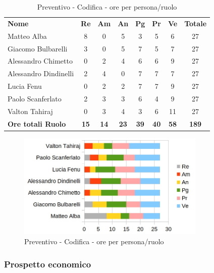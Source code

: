 		\begin{table} [h!]
			\begin{center}
				\begin{tabular} { m{3.5cm} c c c c c c c }
					\rowcolor{lightgray}
					\textbf{Nome} & \textbf{Re} & \textbf{Am} & \textbf{An} & \textbf{Pg} & \textbf{Pr} & \textbf{Ve} & \textbf{Totale} \\
					Matteo Alba & 8 &0 & 5 & 3 & 5 & 6 & 27 \\
					Giacomo Bulbarelli & 3 & 0& 5 & 7 & 5 & 7 & 27 \\
					Alessandro Chimetto & 0& 2 & 4 & 6 & 6 & 9 & 27 \\
					Alessandro Dindinelli & 2 & 4 & 0& 7 & 7 & 7 & 27 \\
					Lucia Fenu &0 & 2 & 2 & 7 & 7 & 9 & 27 \\
					Paolo Scanferlato & 2 & 3 & 3 & 6 & 4 & 9 & 27 \\
					Valton Tahiraj &0 & 3 & 4 & 3 & 6 & 11 & 27 \\
					\textbf{Ore totali Ruolo} & \textbf{15} & \textbf{14} & \textbf{23} & \textbf{39} & \textbf{40}& \textbf{58} & \textbf{189}
				\end{tabular}
				\caption{Preventivo - Codifica  - ore per persona/ruolo}
			\end{center}
		\end{table}
		
		\begin{figure} [h!]
			\centering
			\includegraphics[width=0.8\textwidth]{res/img/grafici/progettazione_architetturale_ore_ruolo.jpg}
			\caption{Preventivo - Codifica  - ore per persona/ruolo} 
		\end{figure}
		
	\newpage
	
	\subsubsection{Prospetto economico}
	
